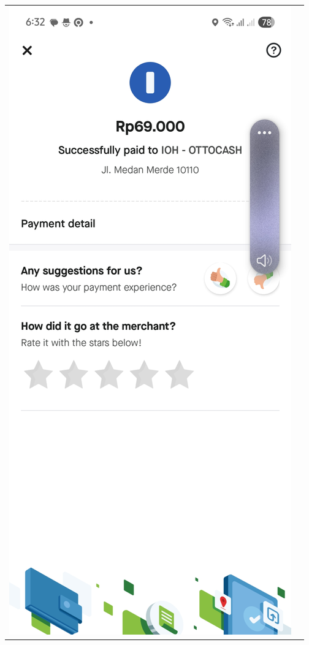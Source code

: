 \begin{table}[h!]
    \centering
    \begin{tabularx}{\textwidth}{m{} X}
        \includegraphics[width=\linewidth]{images/contoh-data/qris-2.jpg}

\end{tabularx}
\end{table}
